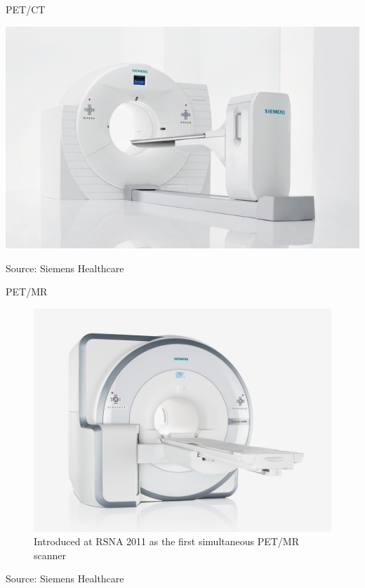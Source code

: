 \begin{frame}{PET/CT}
    \begin{center}
        \includegraphics[height=0.8\textheight]{images/pet_ct}
    \end{center}
    \flushright
    \vspace{-0.5cm}
    \tiny Source: Siemens Healthcare
\end{frame}

\begin{frame}{PET/MR}
    \begin{figure}
        \centering
        \includegraphics[height=0.8\textheight]{images/petmr.jpg}
        \caption{Introduced at RSNA 2011 as the first simultaneous PET/MR scanner}%
    \end{figure}
    \flushright
    \vspace{-0.5cm}
    \tiny Source: Siemens Healthcare
\end{frame}

